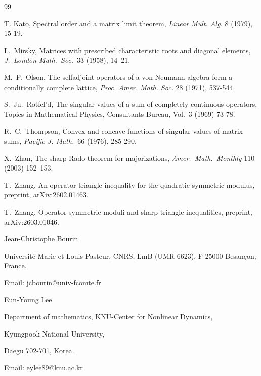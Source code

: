 \documentclass[12pt,reqno]{article}
\theoremstyle{definition}
\theoremstyle{remark}
\numberwithin{equation}{section}
\begin{document}
\begin{thebibliography}{99}
{%

T. Kato, Spectral order and a matrix limit theorem, {\it Linear  Mult. Alg.} 8 (1979),
15-19.

  L.\ Mirsky,  Matrices with prescribed characteristic roots and diagonal elements,  {\it J.\ London Math.\ Soc.}\ 33 (1958), 14–21.

 M.\ P.\ Olson, The selfadjoint operators of a von Neumann algebra form a conditionally complete
lattice, {\it Proc. Amer. Math. Soc.} 28 (1971), 537-544.


 S.\ Ju.\ Rotfel'd,  The singular values of a
sum of completely continuous operators,   Topics in
Mathematical Physics, Consultants Bureau, Vol.\ 3 (1969)
73-78.

   R.\ C.\ Thompson, Convex and concave functions of singular
values of matrix sums, {\it Pacific J. Math.}\  66 (1976), 285-290.



 X.\ Zhan, The sharp Rado theorem for majorizations, {\it Amer.\ Math.\ Monthly} 110
(2003) 152--153.

 T.\ Zhang, An operator triangle inequality for the quadratic symmetric modulus, preprint, arXiv:2602.01463.

 T.\ Zhang, Operator symmetric moduli and sharp triangle inequalities, preprint,  arXiv:2603.01046.
}

\end{thebibliography}

\vskip 15pt
\noindent
Jean-Christophe Bourin

\noindent
Université Marie et Louis Pasteur, CNRS, LmB (UMR 6623), F-25000 Besançon, France.

\noindent


\noindent


\noindent
Email: jcbourin@univ-fcomte.fr



  \vskip 15pt\noindent
Eun-Young Lee

\noindent
Department of mathematics, KNU-Center for Nonlinear Dynamics,

\noindent
Kyungpook National University,

\noindent
Daegu 702-701, Korea.

\noindent
 Email: eylee89@knu.ac.kr
 
 
\end{document}
